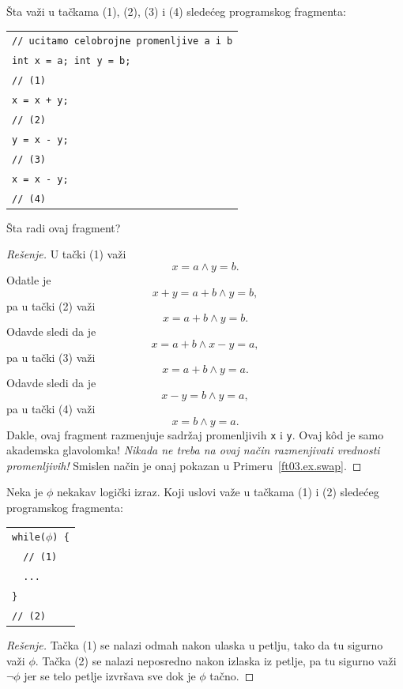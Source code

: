 \begin{EX}
  \v Sta va\v zi u ta\v ckama (1), (2), (3) i (4) slede\'ceg programskog fragmenta:

\begin{tabular}{l}
  \verb"// ucitamo celobrojne promenljive a i b"\\
  \verb"int x = a; int y = b;"\\
  \verb"// (1)"\\
  \verb"x = x + y;"\\
  \verb"// (2)"\\
  \verb"y = x - y;"\\
  \verb"// (3)"\\
  \verb"x = x - y;"\\
  \verb"// (4)"
\end{tabular}

\noindent
\v Sta radi ovaj fragment?
\end{EX}
\begin{proof}[Re\v senje]
  U ta\v cki (1) va\v zi
  $$
    x = a \land y = b.
  $$
  Odatle je
  $$
    x + y = a + b \land y = b,
  $$
  pa u ta\v cki (2) va\v zi
  $$
    x = a + b \land y = b.
  $$
  Odavde sledi da je
  $$
    x = a + b \land x - y = a,
  $$
  pa u ta\v cki (3) va\v zi
  $$
    x = a + b \land y = a.
  $$
  Odavde sledi da je
  $$
    x - y = b \land y = a,
  $$
  pa u ta\v cki (4) va\v zi
  $$
    x = b \land y = a.
  $$
  Dakle, ovaj fragment razmenjuje sadr\v zaj promenljivih \verb"x" i \verb"y". Ovaj k\^od je samo akademska glavolomka!
  \emph{Nikada ne treba na ovaj na\v cin razmenjivati vrednosti promenljivih!}
  Smislen na\v cin je onaj pokazan u Primeru~\ref{ft03.ex.swap}.
\end{proof}

\begin{EX}
  Neka je $\phi$ nekakav logi\v cki izraz.
  Koji uslovi va\v ze u ta\v ckama (1) i (2) slede\'ceg programskog fragmenta:

\medskip

\begin{tabular}{l}
  \verb"while("$\phi$\verb") {"\\
  \verb"  // (1)"\\
  \verb"  ..."\\
  \verb"}"\\
  \verb"// (2)"
\end{tabular}
\end{EX}
\begin{proof}[Re\v senje]
  Ta\v cka (1) se nalazi odmah nakon ulaska u petlju, tako da tu sigurno va\v zi $\phi$.
  Ta\v cka (2) se nalazi neposredno nakon izlaska iz petlje, pa tu sigurno va\v zi $\lnot\phi$ jer se telo
  petlje izvr\v sava sve dok je $\phi$ ta\v cno.
\end{proof}


